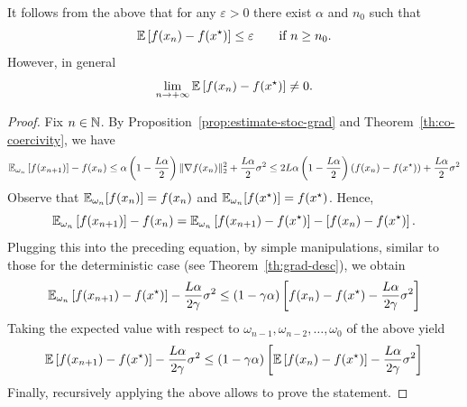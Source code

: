     \begin{remark}
         It follows from the above that for any $\varepsilon>0$ there exist $\alpha$ and $n_0$ such that
         \begin{equation}
             \mathbb{E}\left[ f(x_n)-f(x^\star) \right] \le \varepsilon \qquad \text{if }n\ge n_0.
         \end{equation}
         However, in general
         \begin{equation}
             \lim_{n\to +\infty} \mathbb{E}\left[ f(x_n)-f(x^\star) \right] \neq 0.
         \end{equation}
     \end{remark}
 
     \begin{proof}
         Fix $n\in\mathbb{N}$.
         By Proposition~\ref{prop:estimate-stoc-grad} and Theorem~\ref{th:co-coercivity}, we have
         \begin{equation}
             \mathbb{E}_{\omega_n}\left[ f(x_{n+1}) \right] -f(x_n)
             \le	\alpha\left( 1 - \frac{L\alpha}{2}\right)\|\nabla f(x_n)\|_2^2+\frac{L\alpha}{2}\sigma^2
             \le	2L\alpha\left( 1 - \frac{L\alpha}{2}\right)(f(x_n)-f(x^\star))+\frac{L\alpha}{2}\sigma^2
         \end{equation}
         Observe that $\mathbb{E}_{\omega_n}[f(x_n)]=f(x_n)$ and $\mathbb{E}_{\omega_n}[f(x^\star)]=f(x^\star)$. Hence,
         \begin{equation}
             \mathbb{E}_{\omega_n}\left[ f(x_{n+1}) \right] -f(x_n) = \mathbb{E}_{\omega_n}\left[ f(x_{n+1}) -f(x^\star)\right] -\left[f(x_n) - f(x^\star) \right].
         \end{equation}
         Plugging this into the preceding equation, by simple manipulations, similar to those for the deterministic case (see Theorem~\ref{th:grad-desc}), we obtain
         \begin{equation}
             \mathbb{E}_{\omega_n}\left[ f(x_{n+1}) -f(x^\star)\right]	-\frac{L\alpha}{2\gamma} \sigma^2 \le (1-\gamma\alpha)\left[  f(x_{n}) -f(x^\star)	-\frac{L\alpha}{2\gamma} \sigma^2 \right]
         \end{equation}
         Taking the expected value with respect to $\omega_{n-1}, \omega_{n-2},\ldots, \omega_0$ of the above yield
         \begin{equation}
             \label{eq:ciao}
             \mathbb{E}\left[ f(x_{n+1}) -f(x^\star)\right]	-\frac{L\alpha}{2\gamma} \sigma^2 \le (1-\gamma\alpha)\left[  \mathbb{E}\left[f(x_{n}) -f(x^\star)\right]	-\frac{L\alpha}{2\gamma} \sigma^2 \right]
         \end{equation}
         Finally, recursively applying the above allows to prove the statement.
     \end{proof}
 

